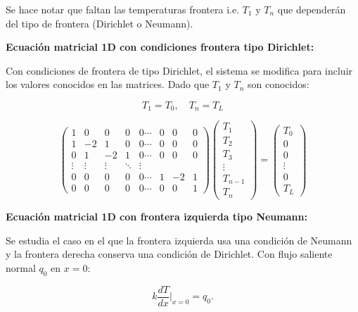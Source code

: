 \documentclass[11pt,a4paper]{article}
\begin{document}
Se hace notar que faltan las temperaturas frontera i.e. $T_1$ y $T_n$ que 
depender\'an del tipo de frontera (Dirichlet o Neumann).

\textbf{Ecuaci\'on matricial 1D con condiciones frontera tipo Dirichlet:}

Con condiciones de frontera de tipo Dirichlet, el sistema se modifica para 
incluir los valores conocidos en las matrices. Dado que $T_1$ y $T_n$ son 
conocidos:

\begin{equation}
T_1 = T_0, \quad T_n = T_L
\end{equation}

\begin{equation}
\begin{pmatrix}
1 & 0 & 0 & 0 & 0  \cdots & 0 & 0 & 0 \\
1 & -2 & 1 & 0 & 0  \cdots & 0 & 0 & 0 \\
0 & 1 & -2 & 1 & 0  \cdots & 0 & 0 & 0 \\
\vdots & \vdots & \vdots & \ddots & \vdots \\
0 & 0 & 0 & 0 & 0  \cdots & 1 & -2 & 1 \\
0 & 0 & 0 & 0 & 0  \cdots & 0 & 0 & 1
\end{pmatrix}
\begin{pmatrix}
T_1 \\
T_2 \\
T_3 \\
\vdots \\
T_{n-1} \\
T_n
\end{pmatrix}
=
\begin{pmatrix}
T_0 \\
0 \\
0 \\
\vdots \\
0 \\
T_L
\end{pmatrix}
\end{equation}

\textbf{Ecuaci\'on matricial 1D con frontera izquierda tipo Neumann:}

Se estudia el caso en el que la frontera izquierda usa una condici\'on de Neumann
y la frontera derecha conserva una condici\'on de Dirichlet. Con flujo saliente
normal $q_0$ en $x=0$:

\begin{equation}
k\frac{dT}{dx}\bigg|_{x=0}=q_0.
\end{equation}
\end{document}
